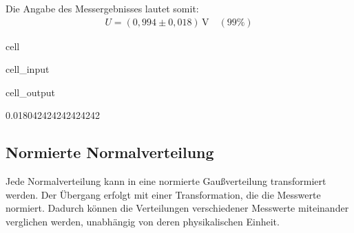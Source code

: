 \documentclass[letterpaper,10pt,english]{jupyterBook}
\begin{document}
\sphinxAtStartPar
Die Angabe des Messergebnisses lautet somit:
\begin{equation*}
\begin{split}U = (0,994 \pm 0,018)\,\mathrm V \quad (99\%)\end{split}
\end{equation*}
\begin{sphinxuseclass}{cell}\begin{sphinxVerbatimInput}

\begin{sphinxuseclass}{cell_input}
\begin{sphinxVerbatim}[commandchars=\\\{\}]
\end{sphinxVerbatim}

\end{sphinxuseclass}\end{sphinxVerbatimInput}
\begin{sphinxVerbatimOutput}

\begin{sphinxuseclass}{cell_output}
\begin{sphinxVerbatim}[commandchars=\\\{\}]
0.018042424242424242
\end{sphinxVerbatim}

\end{sphinxuseclass}\end{sphinxVerbatimOutput}

\end{sphinxuseclass}

\subsection{Normierte Normalverteilung}
\label{\detokenize{content/1_Mittelwert_StdAbw:normierte-normalverteilung}}
\sphinxAtStartPar
Jede Normalverteilung kann in eine normierte Gaußverteilung transformiert werden. Der Übergang erfolgt mit einer Transformation, die die Messwerte normiert. Dadurch können die Verteilungen verschiedener Messwerte miteinander verglichen werden, unabhängig von deren physikalischen Einheit.

\sphinxAtStartPar
{}
\end{document}
